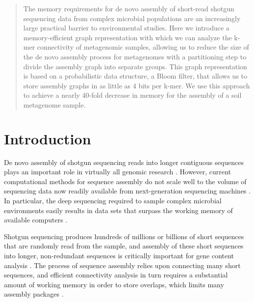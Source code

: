 \documentclass{pnastwo}
\begin{document}
\begin{article}

\begin{abstract}

The memory requirements for de novo assembly of short-read shotgun
sequencing data from complex microbial populations are an increasingly
large practical barrier to environmental studies.  Here we introduce a
memory-efficient graph representation with which we can analyze the
k-mer connectivity of metagenomic samples, allowing us to reduce the
size of the de novo assembly process for metagenomes with a partitioning 
step to divide the assembly graph into separate groups. This graph 
representation is based on a
probabilistic data structure, a Bloom filter, that allows us to store
assembly graphs in as little as 4 bits per k-mer.  We use this
approach to achieve a nearly 40-fold decrease in memory for the assembly of a
soil metagenome sample.

\end{abstract}


\section{Introduction}



De novo assembly of shotgun sequencing reads into longer contiguous
sequences plays an important role in virtually all genomic research
\cite{pubmed19482960}.
However, current computational methods for sequence assembly do not
scale well to the volume of sequencing data now readily available from
next-generation sequencing machines \cite{pubmed19482960,pubmed22147368}.  In particular, the deep
sequencing required to sample complex microbial environments easily
results in data sets that surpass the working memory of available
computers \cite{metahit,rumen}.

Shotgun sequencing produces hundreds of millions or billions of short
sequences that are randomly read from the sample, and assembly of
these short sequences into longer, non-redundant sequences is
critically important for gene content analysis \cite{pubmed19482960}.  The process of
sequence assembly relies upon connecting many short
sequences, and efficient connectivity analysis in turn requires a
substantial amount of working memory in order to store overlaps,
which limits many assembly packages \cite{pubmed22147368}.


\end{article}
\end{document}
